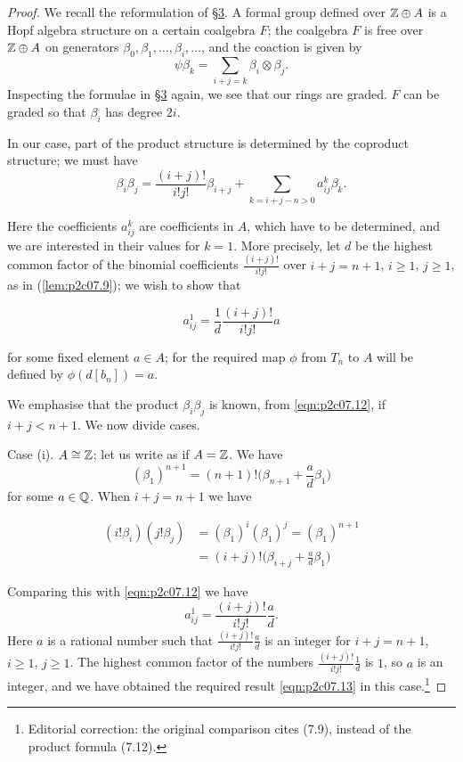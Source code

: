 \documentclass[../main]{subfiles}
\begin{document}
\begin{proof}
We recall the reformulation of \hyperref[sec:p2c3]{\S 3}. A formal group defined over $\mathbb{Z} \oplus A$ is a Hopf algebra structure on a certain coalgebra $F$; the coalgebra $F$ is free over $\mathbb{Z} \oplus A$ on generators $\beta_0, \beta_1, \ldots, \beta_i, \ldots$, and the coaction is given by \[\psi \beta_k = \sum_{i + j = k} \beta_i \otimes \beta_j.\] Inspecting the formulae in \hyperref[sec:p2c3]{\S 3} again, we see that our rings are graded. $F$ can be graded so that $\beta_i$ has degree $2i$. 

In our case, part of the product structure is determined by the coproduct structure; we must have
\begin{equation}
\tag{7.12}
\label{eqn:p2c07.12}
\beta_i \beta_j = \frac {(i + j)!} {i! j!} \beta_{i + j} + \sum_{k = i + j - n > 0} a_{ij}^k \beta_k.
\end{equation}

Here the coefficients $a_{ij}^k$ are coefficients in $A$, which have to be determined, and we are interested in their values for $k = 1$. More precisely, let $d$ be the highest common factor of the binomial coefficients $\tfrac {(i + j)!} {i! j!}$ over $i + j = n + 1$, $i \ge 1$, $j \ge 1$, as in (\ref{lem:p2c07.9}); we wish to show that 

\begin{equation}
\tag{7.13}
\label{eqn:p2c07.13}
a_{ij}^1 = \frac 1 d \frac {(i + j)!} {i! j!} a
\end{equation}

for some fixed element $a \in A$; for the required map $\phi$ from $T_n$ to $A$ will be defined by $\phi(d[b_n]) = a$. 

We emphasise that the product $\beta_i \beta_j$ is known, from \eqref{eqn:p2c07.12}, if $i + j < n + 1$. We now divide cases.

Case (i). $A \cong \mathbb{Z}$; let us write as if $A = \mathbb{Z}$. We have \[(\beta_1)^{n + 1} = (n + 1)! \bigg(\beta_{n + 1} + \frac a d \beta_1\bigg)\] for some $a \in \mathbb{Q}$. When $i + j = n + 1$ we have 

\begin{align*}
(i! \beta_i) (j! \beta_j) & = (\beta_1)^i (\beta_1)^j = (\beta_1)^{n + 1} \\ & = (i + j)! \bigg(\beta_{i + j} + \frac a d \beta_1\bigg)
\end{align*}

Comparing this with \eqref{eqn:p2c07.12} we have \[a_{ij}^1 = \frac {(i + j)!} {i! j!} \frac a d.\] Here $a$ is a rational number such that $\displaystyle \frac {(i + j)!} {i! j!} \frac a d$ is an integer for $i + j = n + 1$, $i \ge 1$, $j \ge 1$. The highest common factor of the numbers $\displaystyle \frac {(i + j)!} {i! j!} \frac 1 d$ is $1$, so $a$ is an integer, and we have obtained the required result \eqref{eqn:p2c07.13} in this case.\footnote{Editorial correction: the original comparison cites (7.9), instead of the product formula (7.12).}


\end{proof}
\end{document}
